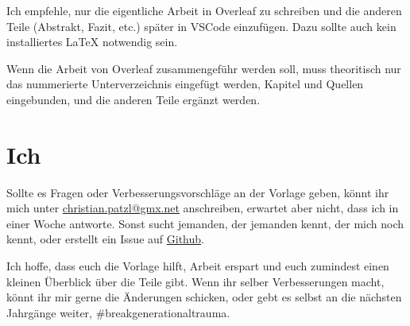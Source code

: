Ich empfehle, nur die eigentliche Arbeit in Overleaf zu schreiben und die anderen Teile (Abstrakt, Fazit, etc.) später in VSCode einzufügen. Dazu sollte auch kein installiertes \LaTeX{} notwendig sein.

Wenn die Arbeit von Overleaf zusammengeführ werden soll, muss theoritisch nur das nummerierte Unterverzeichnis eingefügt werden, Kapitel und Quellen eingebunden, und die anderen Teile ergänzt werden.

\section{Ich}
\makeatletter
Sollte es Fragen oder Verbesserungsvorschläge an der Vorlage geben, könnt ihr mich unter \href{mailto:christian.patzl@gmx.net}{christian.patzl@gmx.net} anschreiben, erwartet aber nicht, dass ich in einer Woche antworte. Sonst sucht jemanden, der jemanden kennt, der mich noch kennt, oder erstellt ein Issue auf \href{https://github.com/Christiano300/DiplVorlage}{Github}.
\makeatother

Ich hoffe, dass euch die Vorlage hilft, Arbeit erspart und euch zumindest einen kleinen Überblick über die Teile gibt. Wenn ihr selber Verbesserungen macht, könnt ihr mir gerne die Änderungen schicken, oder gebt es selbst an die nächsten Jahrgänge weiter, \#breakgenerationaltrauma.